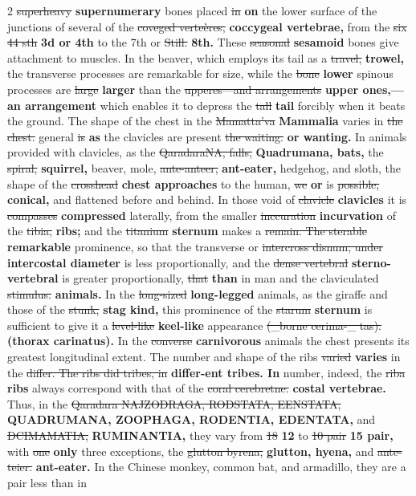 \documentclass[10pt]{article}
\begin{document}
\begin{multicols}{2}
\sout{superheavy} \textbf{supernumerary} bones placed \sout{in} \textbf{on} the lower surface of the junctions of several of the \sout{coveged verteères,} \textbf{coccygeal vertebrae,} from the \sout{six 44 sth} \textbf{3d or 4th} to the 7th or \sout{Still.} \textbf{8th.} These \sout{seasonal} \textbf{sesamoid} bones give attachment to muscles. In the beaver, which employs its tail as a \sout{travel,} \textbf{trowel,} the transverse processes are remarkable for size, while the \sout{bone} \textbf{lower} spinous processes are \sout{large} \textbf{larger} than the \sout{upperes—and arrangements} \textbf{upper ones,—an arrangement} which enables it to depress the \sout{tall} \textbf{tail} forcibly when it beats the ground. The shape of the chest in the \sout{Mamatta’va} \textbf{Mammalia} varies in \sout{the chest.} general \sout{is} \textbf{as} the clavicles are present \sout{the waiting.} \textbf{or wanting.} In animals provided with clavicles, as the \sout{QaradaraNA, falls,} \textbf{Quadrumana, bats,} the \sout{spiral,} \textbf{squirrel,} beaver, mole, \sout{ante-anteer,} \textbf{ant-eater,} hedgehog, and sloth, the shape of the \sout{crosshead} \textbf{chest approaches} to the human, \sout{we} \textbf{or} is \sout{possible,} \textbf{conical,} and flattened before and behind. In those void of \sout{clavicle} \textbf{clavicles} it is \sout{compasses} \textbf{compressed} laterally, from the smaller \sout{inccuration} \textbf{incurvation} of the \sout{tibia,} \textbf{ribs;} and the \sout{titanium} \textbf{sternum} makes a \sout{remain. The sterable} \textbf{remarkable} prominence, so that the transverse or \sout{intercross disnum, under} \textbf{intercostal diameter} is less proportionally, and the \sout{dense vertebral} \textbf{sterno-vertebral} is greater proportionally, \sout{that} \textbf{than} in man and the claviculated \sout{stimulus.} \textbf{animals.} In the \sout{long-sized} \textbf{long-legged} animals, as the giraffe and those of the \sout{stunk,} \textbf{stag kind,} this prominence of the \sout{starum} \textbf{sternum} is sufficient to give it a \sout{level-like} \textbf{keel-like} appearance \sout{(\_borne cerima-\_ tas).} \textbf{(thorax carinatus).} In the \sout{converse} \textbf{carnivorous} animals the chest presents its greatest longitudinal extent. The number and shape of the ribs \sout{varied} \textbf{varies} in the \sout{differ. The ribs did tribes, in} \textbf{differ-ent tribes. In} number, indeed, the \sout{riba} \textbf{ribs} always correspond with that of the \sout{coral cerebretne.} \textbf{costal vertebrae.} Thus, in the \sout{Qaradara NAJZODRAGA, RODSTATA, EENSTATA,} \textbf{QUADRUMANA, ZOOPHAGA, RODENTIA, EDENTATA,} and \sout{DCIMAMATIA,} \textbf{RUMINANTIA,} they vary from \sout{18} \textbf{12} to \sout{10 pair} \textbf{15 pair,} with \sout{one} \textbf{only} three exceptions, the \sout{glutton byrena,} \textbf{glutton, hyena,} and \sout{ante-teier.} \textbf{ant-eater.} In the Chinese monkey, common bat, and armadillo, they are a pair less than in
\end{multicols}
\end{document}
